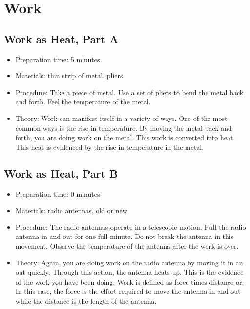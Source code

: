 \section{Work}

\subsection{Work as Heat, Part A}
\begin{itemize}
\item{Preparation time: 5 minutes}
\item{Materials: thin strip of metal, pliers}
\item{Procedure: Take a piece of metal. Use a set of pliers to bend the metal back and forth. Feel the temperature of the metal.}
\item{Theory: Work can manifest itself in a variety of ways. One of the most common ways is the rise in temperature. By moving the metal back and forth, you are doing work on the metal. This work is converted into heat. This heat is evidenced by the rise in temperature in the metal. }
\end{itemize}

\subsection{Work as Heat, Part B}
\begin{itemize}
\item{Preparation time: 0 minutes}
\item{Materials: radio antennas, old or new }
\item{Procedure: The radio antennas operate in a telescopic motion. Pull the radio antenna in and out for one full minute. Do not break the antenna in this movement. Observe the temperature of the antenna after the work is over.}
\item{Theory: Again, you are doing work on the radio antenna by moving it in an out quickly. Through this action, the antenna heats up. This is the evidence of the work you have been doing. Work is defined as force times distance or. In this case, the force is the effort required to move the antenna in and out while the distance is the length of the antenna.}
\end{itemize}

